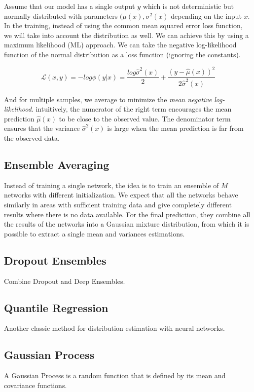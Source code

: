 Assume that our model has a single output $y$ which is not deterministic but normally distributed with parameters $(\mu(x), \sigma^2(x)$ depending on the input $x$. In the training, instead of using the common mean squared error loss function, we will take into account the distribution as well. We can achieve this by using a maximum likelihood (ML) approach. We can take the negative log-likelihood function of the normal distribution as a loss function (ignoring the constants).

\begin{equation}
    \mathcal{L}(x, y) = -log \phi(y|x) = \frac{log \hat{\sigma}^2(x)}{2}+\frac{(y-\hat{\mu}(x))^2}{2\hat{\sigma}^2(x)}
\end{equation}

And for multiple samples, we average to minimize the \textit{mean negative log-likelihood}.
intuitively, the numerator of the right term encourages the mean prediction $\hat{\mu}(x)$ to be close to the observed value. The denominator term ensures that the variance $\hat{\sigma}^2(x)$ is large when the mean prediction is far from the observed data.

\subsection{Ensemble Averaging}

Instead of training a single network, the idea is to train an ensemble of $M$ networks with different initialization. We expect that all the networks behave similarly in areas with sufficient training data and give completely different results where there is no data available.
For the final prediction, they combine all the results of the networks into a Gaussian mixture distribution, from which it is possible to extract a single mean and variances estimations.

\subsection{Dropout Ensembles}
Combine Dropout and Deep Ensembles.

\subsection{Quantile Regression}
Another classic method for distribution estimation with neural networks.

\subsection{Gaussian Process}
A Gaussian Process is a random function that is defined by its mean and covariance functions.

